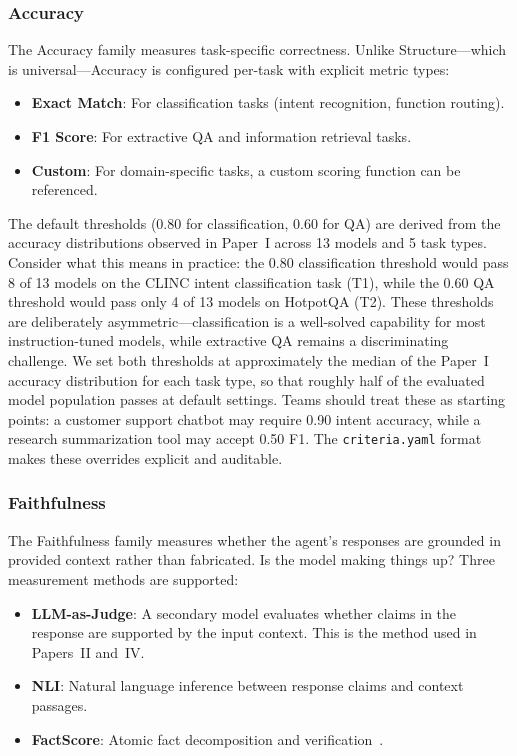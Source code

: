 \documentclass[11pt]{article}
\newcommand{\criteriayaml}{\texttt{criteria.yaml}}
\begin{document}
\subsubsection{Accuracy}

The Accuracy family measures task-specific correctness. Unlike Structure---which is universal---Accuracy is configured per-task with explicit metric types:

\begin{itemize}[leftmargin=12pt]
  \item \textbf{Exact Match}: For classification tasks (intent recognition, function routing).
  \item \textbf{F1 Score}: For extractive QA and information retrieval tasks.
  \item \textbf{Custom}: For domain-specific tasks, a custom scoring function can be referenced.
\end{itemize}

The default thresholds (0.80 for classification, 0.60 for QA) are derived from the accuracy distributions observed in Paper~I across 13 models and 5 task types. Consider what this means in practice: the 0.80 classification threshold would pass 8 of 13 models on the CLINC intent classification task (T1), while the 0.60 QA threshold would pass only 4 of 13 models on HotpotQA (T2). These thresholds are deliberately asymmetric---classification is a well-solved capability for most instruction-tuned models, while extractive QA remains a discriminating challenge. We set both thresholds at approximately the median of the Paper~I accuracy distribution for each task type, so that roughly half of the evaluated model population passes at default settings. Teams should treat these as starting points: a customer support chatbot may require 0.90 intent accuracy, while a research summarization tool may accept 0.50 F1. The \criteriayaml{} format makes these overrides explicit and auditable.

\subsubsection{Faithfulness}

The Faithfulness family measures whether the agent's responses are grounded in provided context rather than fabricated. Is the model making things up? Three measurement methods are supported:

\begin{itemize}[leftmargin=12pt]
  \item \textbf{LLM-as-Judge}: A secondary model evaluates whether claims in the response are supported by the input context. This is the method used in Papers~II and~IV.
  \item \textbf{NLI}: Natural language inference between response claims and context passages.
  \item \textbf{FactScore}: Atomic fact decomposition and verification~\citep{es2023ragas}.
\end{itemize}
\end{document}
